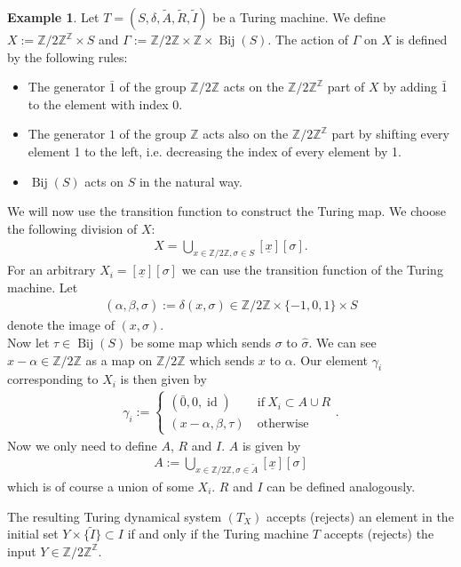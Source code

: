 \documentclass[12pt,a4paper]{scrartcl}
\theoremstyle{plain}
\theoremstyle{definition}
\newtheorem{Example}[Theorem]{Example}
\numberwithin{equation}{section}
\newcommand{\Z}{\mathbb{Z}} %
\newcommand{\2}{\mathbb{Z} / 2 \mathbb{Z}}
\newcommand{\1}{\bar{1}}
\newcommand{\0}{\bar{0}}
\newcommand{\Bij}{\operatorname{Bij}}
\newcommand{\id}{\operatorname{id}}
\begin{document}
\begin{Example}\label{TMtoTDS}
	Let  $T=(S,\delta, \tilde{A}, \tilde{R}, \tilde{I})$ be a Turing machine. We define $X := \2^\Z \times S$ and $\Gamma := \2 \times \Z \times \Bij(S)$.
	The action of $\Gamma$ on $X$ is defined by the following rules:
	\begin{itemize}
		\item The generator $\1$ of the group $\Z / 2\Z$ acts on the $\Z / 2\Z^\Z$ part of $X$ by adding $\1$ to the element with index $0$.
		\item The generator $1$ of the group $\Z$ acts also on the $\Z / 2\Z^\Z$ part by shifting every element 1 to the left, i.e. decreasing the index of every element by 1.
		\item $\Bij(S)$ acts on $S$ in the natural way.
	\end{itemize}
	We will now use the transition function to construct the Turing map. We choose the following division of $X$:
	\begin{align*}
	X = \bigcup_{x \in \2, \sigma \in S} [\underline{x}][\sigma].
	\end{align*}
	For an arbitrary $X_i = [\underline{x}][\sigma]$ we can use the transition function of the Turing machine. Let
	\begin{align*}
		(\alpha, \beta,\hat{\sigma}) := \delta(x, \sigma) \in \2 \times \{-1, 0, 1\} \times S
	\end{align*} 
	denote  the image of $(x, \sigma)$. \\
	Now let $\tau \in \Bij(S)$ be some map which sends $\sigma$ to $\hat{\sigma}$. We can see $x-\alpha \in \2$ as a map on $\2$ which sends $x$ to $\alpha$. Our element $\gamma_i$ corresponding to $X_i$ is then given by 
	\begin{align*}
		\gamma_i := \begin{cases}
			(\0, 0, \id) & ~\text{if}~ X_i \subset A \cup R \\
			(x-\alpha, \beta, \tau) & ~\text{otherwise}
		\end{cases}.
	\end{align*} 
	Now we only need to define $A$, $R$ and $I$. $A$ is given by
	\begin{align*}
	A := \bigcup_{x \in \2, \sigma \in \tilde{A}}[\underline{x}][\sigma]
	\end{align*}
	which is of course a union of some $X_i$. $R$ and $I$ can be defined analogously. 
	
	The resulting Turing dynamical system $(T_X)$ accepts (rejects) an element in the initial set $Y \times \{\tilde{I}\} \subset I$ if and only if the Turing machine $T$ accepts (rejects) the input $Y \in \2^\Z$.
\end{Example} 
\end{document}
